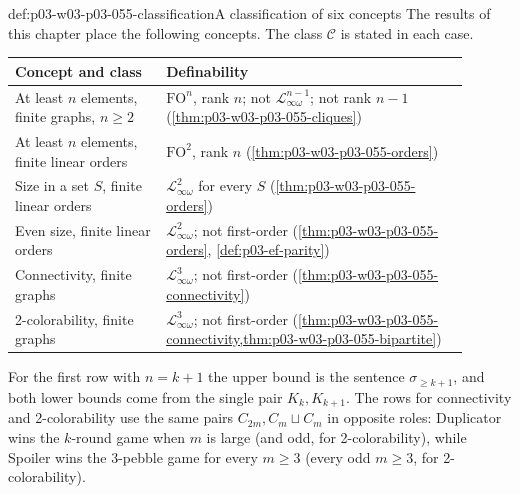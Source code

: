 \begin{hbexample}{def:p03-w03-p03-055-classification}{A classification of six concepts}
The results of this chapter place the following concepts. The class
\(\mathcal C\) is stated in each case.
\begin{center}
\begin{tabular}{p{0.3\linewidth}p{0.6\linewidth}}
\hline
Concept and class & Definability \\
\hline
At least \(n\) elements, finite graphs, \(n\ge2\) &
\(\mathrm{FO}^n\), rank \(n\); not \(\mathcal L^{n-1}_{\infty\omega}\); not
rank \(n-1\) (\cref{thm:p03-w03-p03-055-cliques}) \\
At least \(n\) elements, finite linear orders &
\(\mathrm{FO}^2\), rank \(n\) (\cref{thm:p03-w03-p03-055-orders}) \\
Size in a set \(S\), finite linear orders &
\(\mathcal L^2_{\infty\omega}\) for every \(S\)
(\cref{thm:p03-w03-p03-055-orders}) \\
Even size, finite linear orders &
\(\mathcal L^2_{\infty\omega}\); not first-order
(\cref{thm:p03-w03-p03-055-orders}, \cref{def:p03-ef-parity}) \\
Connectivity, finite graphs &
\(\mathcal L^3_{\infty\omega}\); not first-order
(\cref{thm:p03-w03-p03-055-connectivity}) \\
2-colorability, finite graphs &
\(\mathcal L^3_{\infty\omega}\); not first-order
(\cref{thm:p03-w03-p03-055-connectivity,thm:p03-w03-p03-055-bipartite}) \\
\hline
\end{tabular}
\end{center}
For the first row with \(n=k+1\) the upper bound is the sentence
\(\sigma_{\ge k+1}\), and both lower bounds come from the single pair
\(K_k,K_{k+1}\). The rows for connectivity and 2-colorability use the same
pairs \(C_{2m},C_m\sqcup C_m\) in opposite roles: Duplicator wins the
\(k\)-round game when \(m\) is large (and odd, for 2-colorability), while
Spoiler wins the \(3\)-pebble game for every \(m\ge3\) (every odd
\(m\ge3\), for 2-colorability).
\end{hbexample}

